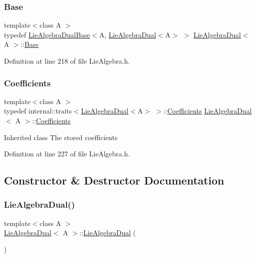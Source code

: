 \subsubsection{\texorpdfstring{Base}{Base}}
{\footnotesize\ttfamily template$<$class A $>$ \\
typedef \hyperlink{class_lie_algebra_dual_base}{Lie\+Algebra\+Dual\+Base}$<$A, \hyperlink{class_lie_algebra_dual}{Lie\+Algebra\+Dual}$<$A$>$ $>$ \hyperlink{class_lie_algebra_dual}{Lie\+Algebra\+Dual}$<$ A $>$\+::\hyperlink{class_lie_algebra_dual_ac465396ba89ca481f86d1ce4d4e63a46}{Base}\hspace{0.3cm}{\ttfamily [protected]}}



Definition at line 218 of file Lie\+Algebra.\+h.

\hypertarget{class_lie_algebra_dual_a82710c51eb4d0b6cbd190e76a33fbc17}{}\label{class_lie_algebra_dual_a82710c51eb4d0b6cbd190e76a33fbc17} 
\subsubsection{\texorpdfstring{Coefficients}{Coefficients}}
{\footnotesize\ttfamily template$<$class A $>$ \\
typedef internal\+::traits$<$\hyperlink{class_lie_algebra_dual}{Lie\+Algebra\+Dual}$<$A$>$ $>$\+::\hyperlink{class_lie_algebra_dual_a82710c51eb4d0b6cbd190e76a33fbc17}{Coefficients} \hyperlink{class_lie_algebra_dual}{Lie\+Algebra\+Dual}$<$ A $>$\+::\hyperlink{class_lie_algebra_dual_a82710c51eb4d0b6cbd190e76a33fbc17}{Coefficients}}

Inherited class The stored coefficients 

Definition at line 227 of file Lie\+Algebra.\+h.



\subsection{Constructor \& Destructor Documentation}
\hypertarget{class_lie_algebra_dual_a7895f043d19eeee0aba750b83b45da7e}{}\label{class_lie_algebra_dual_a7895f043d19eeee0aba750b83b45da7e} 
\subsubsection{\texorpdfstring{Lie\+Algebra\+Dual()}{LieAlgebraDual()}}
{\footnotesize\ttfamily template$<$class A $>$ \\
\hyperlink{class_lie_algebra_dual}{Lie\+Algebra\+Dual}$<$ A $>$\+::\hyperlink{class_lie_algebra_dual}{Lie\+Algebra\+Dual} (\begin{DoxyParamCaption}\item[{const \hyperlink{class_lie_algebra_dual}{Lie\+Algebra\+Dual}$<$ A $>$ \&}]{ }\end{DoxyParamCaption})\hspace{0.3cm}{\ttfamily [inline]}}

